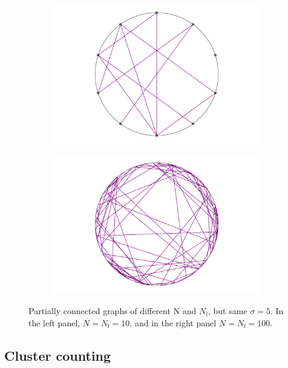 \begin{figure}[t]
	\begin{subfigure}{0.5\textwidth}
	\centering
	\includegraphics[width=\textwidth]{figures/partially-connected-graph.pdf}
\end{subfigure}
	\begin{subfigure}{0.5\textwidth}
	\centering
	\includegraphics[width=\textwidth]{figures/partially-connected-graph-many-points-nPoints-100-nBonds-100-sigma-5.pdf}
\end{subfigure}
	\caption{Partially connected graphs of different N and $N_l$, but same $\sigma=5$. In the left panel, $N=N_l=10$, and in the right panel $N=N_l=100$.}
	\label{fig:a-partially-connected-graph}
\end{figure}

\subsection{Cluster counting}

